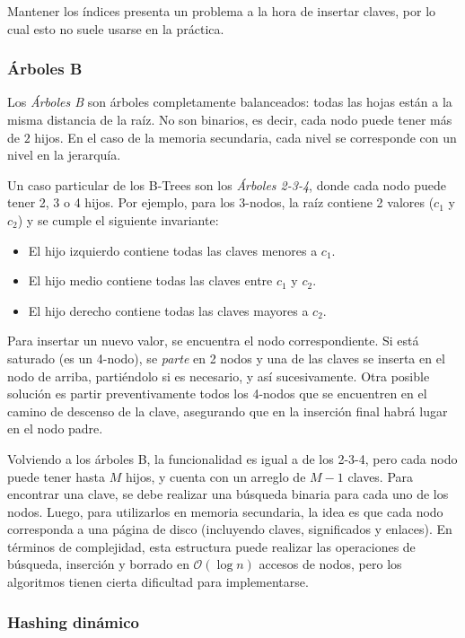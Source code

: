 \documentclass{article}
\newcommand{\BigO}[1]{{\mathcal{O}(#1)}}
\begin{document}
Mantener los índices presenta un problema a la hora de insertar claves, por lo cual esto no suele usarse en la práctica.

\subsubsection{Árboles B}

Los \textit{Árboles B} son árboles completamente balanceados: todas las hojas están a la misma distancia de la raíz. No son binarios, es decir, cada nodo puede tener más de $2$ hijos. En el caso de la memoria secundaria, cada nivel se corresponde con un nivel en la jerarquía.

Un caso particular de los B-Trees son los \textit{Árboles 2-3-4}, donde cada nodo puede tener 2, 3 o 4 hijos. Por ejemplo, para los 3-nodos, la raíz contiene 2 valores ($c_1$ y $c_2$) y se cumple el siguiente invariante:
\begin{itemize}
    \item El hijo izquierdo contiene todas las claves menores a $c_1$.
    \item El hijo medio contiene todas las claves entre $c_1$ y $c_2$.
    \item El hijo derecho contiene todas las claves mayores a $c_2$.
\end{itemize} 

Para insertar un nuevo valor, se encuentra el nodo correspondiente. Si está saturado (es un 4-nodo), se \textit{parte} en 2 nodos y una de las claves se inserta en el nodo de arriba, partiéndolo si es necesario, y así sucesivamente. Otra posible solución es partir preventivamente todos los 4-nodos que se encuentren en el camino de descenso de la clave, asegurando que en la inserción final habrá lugar en el nodo padre.

Volviendo a los árboles B, la funcionalidad es igual a de los 2-3-4, pero cada nodo puede tener hasta $M$ hijos, y cuenta con un arreglo de $M-1$ claves. Para encontrar una clave, se debe realizar una búsqueda binaria para cada uno de los nodos. Luego, para utilizarlos en memoria secundaria, la idea es que cada nodo corresponda a una página de disco (incluyendo claves, significados y enlaces). En términos de complejidad, esta estructura puede realizar las operaciones de búsqueda, inserción y borrado en $\BigO{\log{n}}$ accesos de nodos, pero los algoritmos tienen cierta dificultad para implementarse.

\subsubsection{Hashing dinámico}
\end{document}
